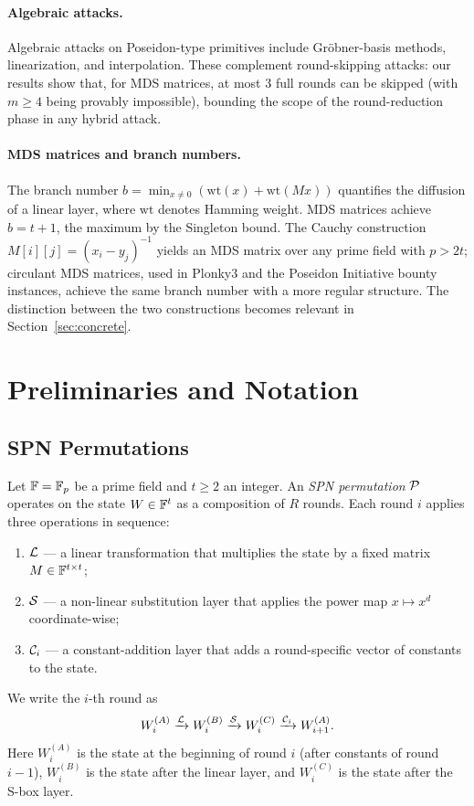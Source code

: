 \documentclass[11pt]{article}
\begin{document}
\paragraph{Algebraic attacks.}
Algebraic attacks on Poseidon-type primitives include Gr{\"o}bner-basis methods, linearization, and interpolation. These complement round-skipping attacks: our results show that, for MDS matrices, at most 3 full rounds can be skipped (with $m \geq 4$ being provably impossible), bounding the scope of the round-reduction phase in any hybrid attack.

\paragraph{MDS matrices and branch numbers.}
The branch number $b = \min_{x \neq 0}(\mathrm{wt}(x) + \mathrm{wt}(Mx))$ quantifies the diffusion of a linear layer, where $\mathrm{wt}$ denotes Hamming weight. MDS matrices achieve $b = t+1$, the maximum by the Singleton bound. The Cauchy construction $M[i][j] = (x_i - y_j)^{-1}$ yields an MDS matrix over any prime field with $p > 2t$; circulant MDS matrices, used in Plonky3 and the Poseidon Initiative bounty instances, achieve the same branch number with a more regular structure. The distinction between the two constructions becomes relevant in Section~\ref{sec:concrete}.

\section{Preliminaries and Notation}
\label{sec:prelim}

\subsection{SPN Permutations}

Let $\mathbb{F} = \mathbb{F}_p$ be a prime field and $t \geq 2$ an integer. An \emph{SPN permutation} $\mathcal{P}$ operates on the state $W \in \mathbb{F}^t$ as a composition of $R$ rounds. Each round $i$ applies three operations in sequence:
\begin{enumerate}
    \item $\mathcal{L}$ — a linear transformation that multiplies the state by a fixed matrix $M \in \mathbb{F}^{t \times t}$;
    \item $\mathcal{S}$ — a non-linear substitution layer that applies the power map $x \mapsto x^d$ coordinate-wise;
    \item $\mathcal{C}_i$ — a constant-addition layer that adds a round-specific vector of constants to the state.
\end{enumerate}
We write the $i$-th round as
\[
    W_i^{(A)}\xrightarrow{\mathcal{L}}W_i^{(B)}\xrightarrow{\mathcal{S}}W_i^{(C)}\xrightarrow{\mathcal{C}_i}W_{i+1}^{(A)}.
\]
Here $W_i^{(A)}$ is the state at the beginning of round $i$ (after constants of round $i-1$), $W_i^{(B)}$ is the state after the linear layer, and $W_i^{(C)}$ is the state after the S-box layer.
\end{document}
